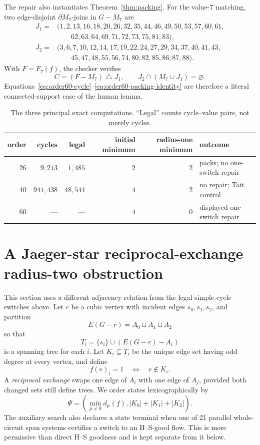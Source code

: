 \documentclass[11pt]{article}
\theoremstyle{definition}
\theoremstyle{remark}
\newcommand{\bd}{\partial}
\newcommand{\symdiff}{\mathbin{\triangle}}
\numberwithin{equation}{section}
\begin{document}
The repair also instantiates Theorem~\ref{thm:packing}.  For the
value-\(7\) matching, two edge-disjoint \(\bd M_7\)-joins in
\(G-M_7\) are
\begin{equation}
\begin{split}
J_1={}&(1,2,13,16,18,20,26,32,35,44,46,49,50,53,57,60,61,\\
      &\qquad62,63,64,69,71,72,73,75,81,83),\\
J_2={}&(3,6,7,10,12,14,17,19,22,24,27,29,34,37,40,41,43,\\
      &\qquad45,47,48,55,56,74,80,82,85,86,87,88).
\end{split}
\label{eq:order60-joins}
\end{equation}
With \(F=F_7(f)\), the checker verifies
\begin{equation}
             C=(F-M_7)\symdiff J_1,\qquad
             J_2\cap(M_7\cup J_1)=\varnothing.
\label{eq:order60-packing-identity}
\end{equation}
Equations~\eqref{eq:order60-cycle}--\eqref{eq:order60-packing-identity}
are therefore a literal connected-support case
of the human lemma.

\begin{table}[t]
\centering
\caption{The three principal exact computations.  ``Legal'' counts
cycle--value pairs, not merely cycles.}
\begin{tabular}{@{}rrrrrl@{}}
\toprule
order & cycles & legal & initial minimum & radius-one minimum & outcome\\
\midrule
26 & \(9{,}213\)   & \(1{,}485\)  & \(2\) & \(2\) & packs; no one-switch repair\\
40 & \(941{,}438\) & \(48{,}544\) & \(4\) & \(2\) & no repair; Tait control\\
60 & ---           & ---          & \(4\) & \(0\) & displayed one-switch repair\\
\bottomrule
\end{tabular}
\end{table}

\section{A Jaeger-star reciprocal-exchange radius-two obstruction}
\label{sec:jaeger}

This section uses a different adjacency relation from the legal
simple-cycle switches above.  Let \(r\) be a cubic vertex with incident
edges \(s_0,s_1,s_2\), and partition
\[
                   E(G-r)=A_0\sqcup A_1\sqcup A_2
\]
so that
\[
                  T_i=\{s_i\}\cup(E(G-r)-A_i)
\]
is a spanning tree for each \(i\).  Let \(K_i\subseteq T_i\) be the
unique edge set having odd degree at every vertex, and define
\[
 f(e)_i=1\quad\Longleftrightarrow\quad e\notin K_i.
\]
A \emph{reciprocal exchange} swaps one edge of \(A_i\) with one edge of
\(A_j\), provided both changed sets still define trees.  We order states
lexicographically by
\[
                 \Psi=\left(\min_{\mu\ne0}d_\mu(f),
                         |K_0|+|K_1|+|K_2|\right).
\]
The auxiliary search also declares a state terminal when one of 21
parallel whole-circuit span systems certifies a switch to an H--S-good
flow.  This is more permissive than direct H--S goodness and is kept
separate from it below.
\end{document}
